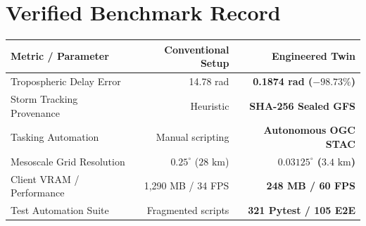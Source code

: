 \documentclass[10pt,letterpaper]{article}
\begin{document}
\begin{minipage}[t]{0.51\textwidth}
    \section*{Verified Benchmark Record}
    \footnotesize
    \begin{tabularx}{\linewidth}{X r r}
        \toprule
        \textbf{Metric / Parameter} & \textbf{Conventional Setup} & \textbf{Engineered Twin} \\
        \midrule
        Tropospheric Delay Error & 14.78 rad & \textbf{0.1874 rad ($-98.73\%$)} \\
        Storm Tracking Provenance & Heuristic & \textbf{SHA-256 Sealed GFS} \\
        Tasking Automation & Manual scripting & \textbf{Autonomous OGC STAC} \\
        Mesoscale Grid Resolution & $0.25^\circ$ ($28\text{ km}$) & \textbf{$0.03125^\circ$ ($3.4\text{ km}$)} \\
        Client VRAM / Performance & 1,290 MB / 34 FPS & \textbf{248 MB / 60 FPS} \\
        Test Automation Suite & Fragmented scripts & \textbf{321 Pytest / 105 E2E} \\
        \bottomrule
    \end{tabularx}
\end{minipage}
\hfill
\end{document}
